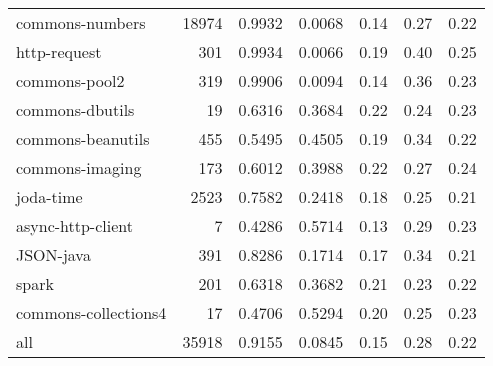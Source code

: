 \begin{table*}
\begin{tabular}{lrrrrrr}
        commons-numbers &  18974 &          0.9932 &          0.0068 &         0.14 &         0.27 &             0.22 \\
           http-request &    301 &          0.9934 &          0.0066 &         0.19 &         0.40 &             0.25 \\
          commons-pool2 &    319 &          0.9906 &          0.0094 &         0.14 &         0.36 &             0.23 \\
        commons-dbutils &     19 &          0.6316 &          0.3684 &         0.22 &         0.24 &             0.23 \\
      commons-beanutils &    455 &          0.5495 &          0.4505 &         0.19 &         0.34 &             0.22 \\
        commons-imaging &    173 &          0.6012 &          0.3988 &         0.22 &         0.27 &             0.24 \\
              joda-time &   2523 &          0.7582 &          0.2418 &         0.18 &         0.25 &             0.21 \\
      async-http-client &      7 &          0.4286 &          0.5714 &         0.13 &         0.29 &             0.23 \\
              JSON-java &    391 &          0.8286 &          0.1714 &         0.17 &         0.34 &             0.21 \\
                  spark &    201 &          0.6318 &          0.3682 &         0.21 &         0.23 &             0.22 \\
   commons-collections4 &     17 &          0.4706 &          0.5294 &         0.20 &         0.25 &             0.23 \\
                    all &  35918 &          0.9155 &          0.0845 &         0.15 &         0.28 &             0.22 \\
\bottomrule
\end{tabular}
\end{table*}
